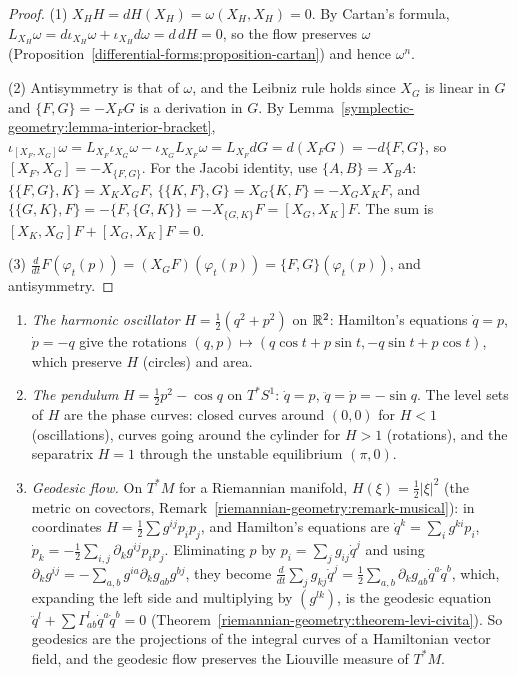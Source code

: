 \begin{proof}
(1) $X_HH = dH(X_H) = \omega(X_H, X_H) = 0$. By Cartan's formula, $L_{X_H}\omega = d\iota_{X_H}\omega + \iota_{X_H}d\omega = d\,dH = 0$, so the flow preserves $\omega$
(Proposition~\ref{differential-forms:proposition-cartan}) and hence $\omega^n$.

(2) Antisymmetry is that of $\omega$, and the Leibniz rule holds since $X_G$ is linear in $G$ and $\{F, G\} = -X_FG$ is a derivation in $G$. By Lemma~\ref{symplectic-geometry:lemma-interior-bracket},
$\iota_{[X_F, X_G]}\omega = L_{X_F}\iota_{X_G}\omega - \iota_{X_G}L_{X_F}\omega = L_{X_F}dG = d(X_FG) = -d\{F, G\}$, so $[X_F, X_G] = -X_{\{F, G\}}$. For the Jacobi identity, use $\{A, B\} = X_BA$:
$\{\{F, G\}, K\} = X_KX_GF$, $\{\{K, F\}, G\} = X_G\{K, F\} = -X_GX_KF$, and $\{\{G, K\}, F\} = -\{F, \{G, K\}\} = -X_{\{G, K\}}F = [X_G, X_K]F$. The sum is $[X_K, X_G]F + [X_G, X_K]F = 0$.

(3) $\frac{d}{dt}F(\varphi_t(p)) = (X_GF)(\varphi_t(p)) = \{F, G\}(\varphi_t(p))$, and antisymmetry.
\end{proof}

\begin{example}\label{symplectic-geometry:example-hamiltonian}
\begin{enumerate}
\item \emph{The harmonic oscillator} $H = \frac12(q^2 + p^2)$ on $\mathbb{R}^2$: Hamilton's equations $\dot q = p$, $\dot p = -q$ give the rotations $(q, p) \mapsto (q\cos t + p\sin t, -q\sin t + p\cos t)$, which preserve
$H$ (circles) and area.
\item \emph{The pendulum} $H = \frac12p^2 - \cos q$ on $T^*S^1$: $\dot q = p$, $\ddot q = \dot p = -\sin q$. The level sets of $H$ are the phase curves: closed curves around $(0, 0)$ for $H < 1$ (oscillations), curves
going around the cylinder for $H > 1$ (rotations), and the separatrix $H = 1$ through the unstable equilibrium $(\pi, 0)$.
\item \emph{Geodesic flow.} On $T^*M$ for a Riemannian manifold, $H(\xi) = \frac12|\xi|^2$ (the metric on covectors, Remark~\ref{riemannian-geometry:remark-musical}): in coordinates $H = \frac12\sum g^{ij}p_ip_j$, and
Hamilton's equations are $\dot q^k = \sum_ig^{ki}p_i$, $\dot p_k = -\frac12\sum_{i,j}\partial_kg^{ij}p_ip_j$. Eliminating $p$ by $p_i = \sum_jg_{ij}\dot q^j$ and using
$\partial_kg^{ij} = -\sum_{a,b}g^{ia}\partial_kg_{ab}g^{bj}$, they become $\frac{d}{dt}\sum_jg_{kj}\dot q^j = \frac12\sum_{a,b}\partial_kg_{ab}\dot q^a\dot q^b$, which, expanding the left side and multiplying by
$(g^{lk})$, is the geodesic equation $\ddot q^l + \sum\Gamma^l_{ab}\dot q^a\dot q^b = 0$ (Theorem~\ref{riemannian-geometry:theorem-levi-civita}). So
geodesics are the projections of the integral curves of a Hamiltonian vector field, and the geodesic flow preserves the Liouville measure of $T^*M$.
\end{enumerate}
\end{example}

